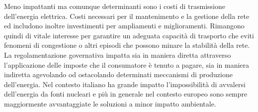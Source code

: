 \documentclass{article}
\begin{document}
Meno impattanti ma comunque determinanti sono i costi di trasmissione dell’energia elettrica. Costi necessari per il mantenimento e la gestione della rete ed includono inoltre investimenti per ampliamenti e miglioramenti. Rimangono quindi di vitale interesse per garantire un adeguata capacità di trasporto che eviti fenomeni di congestione o altri episodi che possono minare la stabilità della rete.\\
La regolamentazione governativa impatta sia in maniera diretta attraverso l’applicazione delle imposte che il consumatore è tenuto a pagare, sia in maniera indiretta agevolando od ostacolando determinati meccanismi di produzione dell’energia. Nel contesto italiano ha grande impatto l’impossibilità di avvalersi dell’energia da fonti nucleari e più in generale nel contesto europeo sono sempre maggiormente avvantaggiate le soluzioni a minor impatto ambientale.\cite{Mase_Sito}\\
\end{document}
